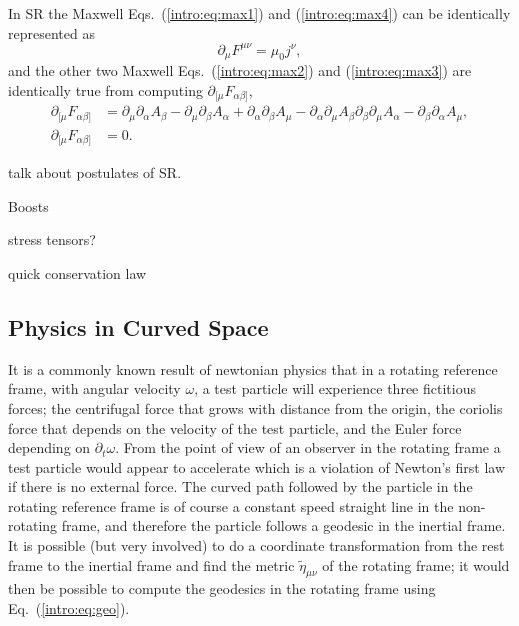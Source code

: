 In SR the Maxwell Eqs.~(\ref{intro:eq:max1}) and (\ref{intro:eq:max4}) can be identically represented as
\begin{equation}
\partial_\mu F^{\mu\nu} = \mu_0 j^\nu,
\end{equation}
and the other two Maxwell Eqs.~(\ref{intro:eq:max2}) and (\ref{intro:eq:max3}) are identically true from computing $\partial_{[\mu} F_{\alpha\beta]}$,
\begin{align}
\partial_{[\mu} F_{\alpha\beta]} &= \partial_\mu\partial_\alpha A_\beta - \partial_\mu\partial_\beta A_\alpha
+\partial_\alpha\partial_\beta A_\mu - \partial_\alpha\partial_\mu A_\beta
\partial_\beta\partial_\mu A_\alpha - \partial_\beta\partial_\alpha A_\mu ,\\\partial_{[\mu} F_{\alpha\beta]} &=0.
\end{align}

talk about postulates of SR.

Boosts

stress tensors?

quick conservation law

\subsection{Physics in Curved Space}
It is a commonly known result of newtonian physics that in a rotating reference frame, with angular velocity $\omega$, a test particle will experience three fictitious forces; the centrifugal force that grows with distance from the origin, the coriolis force that depends on the velocity of the test particle, and the Euler force depending on $\partial_t \omega$. From the point of view of an observer in the rotating frame a test particle would appear to accelerate which is a violation of Newton's first law if there is no external force. The curved path followed by the particle in the rotating reference frame is of course a constant speed straight line in the non-rotating frame, and therefore the particle follows a geodesic in the inertial frame. It is possible (but very involved) to do a coordinate transformation from the rest frame to the inertial frame and find the metric $\tilde{\eta}_{\mu\nu}$ of the rotating frame; it would then be possible to compute the geodesics in the rotating frame using Eq.~(\ref{intro:eq:geo}).

